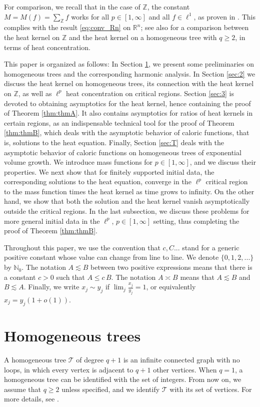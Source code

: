 \documentclass[11pt,a4paper,reqno]{amsart}
\renewcommand\mathcal{\mathscr}
\theoremstyle{plain}
\theoremstyle{remark}
\theoremstyle{definition}
\theoremstyle{remark}
\numberwithin{equation}{section}
\begin{document}
	For comparison, we recall that in the case of $\mathbb{Z}$, the constant $M=M(f)=\sum_{\mathbb{Z}}f$ works for all $p\in[1,\infty]$ and all $f\in \ell^1$, as proven in \cite{Abadiasetal}. This complies with the result \eqref{eq:conv_Rn} on $\mathbb{R}^n$; see also \cite{MedSe} for a comparison between the heat kernel on $\mathbb{Z}$ and the heat kernel on a homogeneous tree with $q\geq2$, in terms of heat concentration.

This paper is organized as follows: In Section \ref{sec:1}, we present some preliminaries on homogeneous trees and the
corresponding harmonic analysis. In Section \ref{sec:2} we discuss the heat kernel on homogeneous trees, its connection with the heat kernel on $\mathbb{Z}$,  as
well as $\ell^p$ heat concentration on critical regions. Section \ref{sec:3} is devoted to obtaining asymptotics for the heat kernel, hence containing the proof of Theorem \ref{thm:thmA}. It also contains asymptotics for ratios of heat kernels in certain regions, as an indispensable technical tool for the proof of Theorem \ref{thm:thmB}, which deals with the asymptotic behavior of caloric functions, that is, solutions to the heat equation. Finally, Section \ref{sec:T} deals with the
asymptotic behavior of caloric functions on homogeneous trees of exponential volume growth. We introduce mass functions for $p\in [1, \infty]$, and we discuss
their properties. We next show that for finitely supported initial data, the corresponding solutions to the heat equation, converge in the $\ell^p$
critical region to the mass function times the heat kernel as time grows to infinity. On the other hand, we
show that both the solution and the heat kernel vanish asymptotically outside the critical regions. In the last
subsection, we discuss these problems for more general initial data in the $\ell^p$, $p\in [1, \infty]$ setting, thus completing the proof of Theorem \ref{thm:thmB}.

 Throughout this paper, we use the convention that $c, C...$
stand for a generic positive
constant whose value can change from line to line. We denote $\{0,1,2,...\}$ by $\mathbb{N}_0$. The notation $A\lesssim B$ between two positive expressions
means that there is a constant $c>0$ such that $A\leq c \, B$. The notation $A\asymp B$ means that $A\lesssim B$ and $B\lesssim A$. Finally, we write $x_j\sim y_j$ if $\lim_{j}\frac{x_j}{y_j}=1$, or equivalently $x_j=y_j(1+o(1))$.
   
	
	\section{Homogeneous trees}\label{sec:1}
	A homogeneous tree $\mathcal{T}$ of degree $q+1$ is an infinite connected graph with no loops, in which every vertex is adjacent to $q+1$ other vertices. When $q=1$, a homogeneous tree can be identified with the set of integers. From now on, we assume that $q\geq 2$ unless specified, and we identify $\mathcal{T}$ with its set of vertices. For more details, see \cite{CMS0, CMS, Figa}.
	
\end{document}
